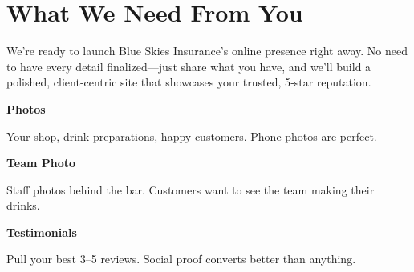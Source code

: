\documentclass[11pt,letterpaper]{article}
\begin{document}
\vspace{0.2em}

\section*{What We Need From You}

We’re ready to launch Blue Skies Insurance’s online presence right away. No need to have every detail finalized—just share what you have, and we’ll build a polished, client‑centric site that showcases your trusted, 5‑star reputation.

\vspace{0.12em}

\noindent\begin{minipage}[t]{0.48\textwidth}
\begin{tcolorbox}[colframe=accent-teal, boxrule=1pt, left=0.7em, right=0.7em, top=0.5em, bottom=0.5em, arc=4pt, boxsep=0pt]
{\bfseries\small\color{accent-teal}Photos}

\vspace{0.15em}

{\small Your shop, drink preparations, happy customers. Phone photos are perfect.}
\end{tcolorbox}

\vspace{0.1em}

\begin{tcolorbox}[colframe=accent-teal, boxrule=1pt, left=0.7em, right=0.7em, top=0.5em, bottom=0.5em, arc=4pt, boxsep=0pt]
{\bfseries\small\color{accent-teal}Team Photo}

\vspace{0.15em}

{\small Staff photos behind the bar. Customers want to see the team making their drinks.}
\end{tcolorbox}

\vspace{0.1em}

\begin{tcolorbox}[colframe=accent-teal, boxrule=1pt, left=0.7em, right=0.7em, top=0.5em, bottom=0.5em, arc=4pt, boxsep=0pt]
{\bfseries\small\color{accent-teal}Testimonials}

\vspace{0.15em}

{\small Pull your best 3--5 reviews. Social proof converts better than anything.}
\end{tcolorbox}
\end{minipage}
\hfill
\end{document}
